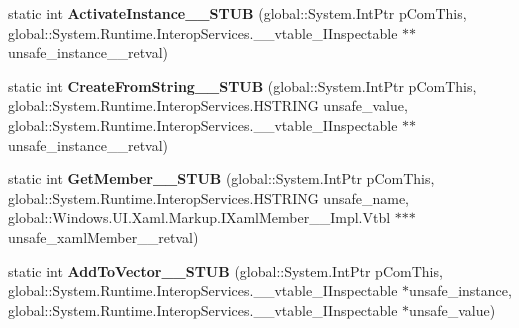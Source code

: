 \begin{DoxyCompactItemize}
\item 
\mbox{\label{struct_windows_1_1_u_i_1_1_xaml_1_1_markup_1_1_i_xaml_type_____impl_1_1_vtbl_a8cc9931ef9dd9b561fc2fd43c2373687}} 
static int {\bfseries Activate\+Instance\+\_\+\+\_\+\+S\+T\+UB} (global\+::\+System.\+Int\+Ptr p\+Com\+This, global\+::\+System.\+Runtime.\+Interop\+Services.\+\_\+\+\_\+vtable\+\_\+\+I\+Inspectable $\ast$$\ast$unsafe\+\_\+instance\+\_\+\+\_\+retval)
\item 
\mbox{\label{struct_windows_1_1_u_i_1_1_xaml_1_1_markup_1_1_i_xaml_type_____impl_1_1_vtbl_a4ec1b4609a6a59d45cf0d088e334b47f}} 
static int {\bfseries Create\+From\+String\+\_\+\+\_\+\+S\+T\+UB} (global\+::\+System.\+Int\+Ptr p\+Com\+This, global\+::\+System.\+Runtime.\+Interop\+Services.\+H\+S\+T\+R\+I\+NG unsafe\+\_\+value, global\+::\+System.\+Runtime.\+Interop\+Services.\+\_\+\+\_\+vtable\+\_\+\+I\+Inspectable $\ast$$\ast$unsafe\+\_\+instance\+\_\+\+\_\+retval)
\item 
\mbox{\label{struct_windows_1_1_u_i_1_1_xaml_1_1_markup_1_1_i_xaml_type_____impl_1_1_vtbl_a57b2a1b073d141eddd531ec9acd7d9ea}} 
static int {\bfseries Get\+Member\+\_\+\+\_\+\+S\+T\+UB} (global\+::\+System.\+Int\+Ptr p\+Com\+This, global\+::\+System.\+Runtime.\+Interop\+Services.\+H\+S\+T\+R\+I\+NG unsafe\+\_\+name, global\+::\+Windows.\+U\+I.\+Xaml.\+Markup.\+I\+Xaml\+Member\+\_\+\+\_\+\+Impl.\+Vtbl $\ast$$\ast$$\ast$unsafe\+\_\+xaml\+Member\+\_\+\+\_\+retval)
\item 
\mbox{\label{struct_windows_1_1_u_i_1_1_xaml_1_1_markup_1_1_i_xaml_type_____impl_1_1_vtbl_a94986475172034a779e4370b06a2bb95}} 
static int {\bfseries Add\+To\+Vector\+\_\+\+\_\+\+S\+T\+UB} (global\+::\+System.\+Int\+Ptr p\+Com\+This, global\+::\+System.\+Runtime.\+Interop\+Services.\+\_\+\+\_\+vtable\+\_\+\+I\+Inspectable $\ast$unsafe\+\_\+instance, global\+::\+System.\+Runtime.\+Interop\+Services.\+\_\+\+\_\+vtable\+\_\+\+I\+Inspectable $\ast$unsafe\+\_\+value)
\item 
\mbox{\label{struct_windows_1_1_u_i_1_1_xaml_1_1_markup_1_1_i_xaml_type_____impl_1_1_vtbl_a826597123ea75e675685fcdc220b845d}} 

\end{DoxyCompactItemize}
